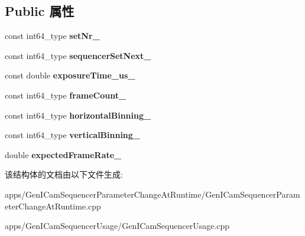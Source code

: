 \subsection*{Public 属性}
\begin{DoxyCompactItemize}
\item 
\hypertarget{struct_sequencer_set_parameter_a5e67c3ba0cb9a043d476dd0e4a773f3c}{const int64\+\_\+type {\bfseries set\+Nr\+\_\+}}\label{struct_sequencer_set_parameter_a5e67c3ba0cb9a043d476dd0e4a773f3c}

\item 
\hypertarget{struct_sequencer_set_parameter_add1f016eea1638bb474d3de07e3b8607}{const int64\+\_\+type {\bfseries sequencer\+Set\+Next\+\_\+}}\label{struct_sequencer_set_parameter_add1f016eea1638bb474d3de07e3b8607}

\item 
\hypertarget{struct_sequencer_set_parameter_a95e40c80c1f934d5dbf8e07497173f98}{const double {\bfseries exposure\+Time\+\_\+us\+\_\+}}\label{struct_sequencer_set_parameter_a95e40c80c1f934d5dbf8e07497173f98}

\item 
\hypertarget{struct_sequencer_set_parameter_a77eb5a87011b6d979c5a9333784f2701}{const int64\+\_\+type {\bfseries frame\+Count\+\_\+}}\label{struct_sequencer_set_parameter_a77eb5a87011b6d979c5a9333784f2701}

\item 
\hypertarget{struct_sequencer_set_parameter_aac118eb1f6871bc49fbebf333c119e58}{const int64\+\_\+type {\bfseries horizontal\+Binning\+\_\+}}\label{struct_sequencer_set_parameter_aac118eb1f6871bc49fbebf333c119e58}

\item 
\hypertarget{struct_sequencer_set_parameter_ab2ed76aecf731394dd2600138e4d95cd}{const int64\+\_\+type {\bfseries vertical\+Binning\+\_\+}}\label{struct_sequencer_set_parameter_ab2ed76aecf731394dd2600138e4d95cd}

\item 
\hypertarget{struct_sequencer_set_parameter_a45fb365fa08dad7e6556158305237a11}{double {\bfseries expected\+Frame\+Rate\+\_\+}}\label{struct_sequencer_set_parameter_a45fb365fa08dad7e6556158305237a11}

\end{DoxyCompactItemize}


该结构体的文档由以下文件生成\+:\begin{DoxyCompactItemize}
\item 
apps/\+Gen\+I\+Cam\+Sequencer\+Parameter\+Change\+At\+Runtime/Gen\+I\+Cam\+Sequencer\+Parameter\+Change\+At\+Runtime.\+cpp\item 
apps/\+Gen\+I\+Cam\+Sequencer\+Usage/Gen\+I\+Cam\+Sequencer\+Usage.\+cpp\end{DoxyCompactItemize}
